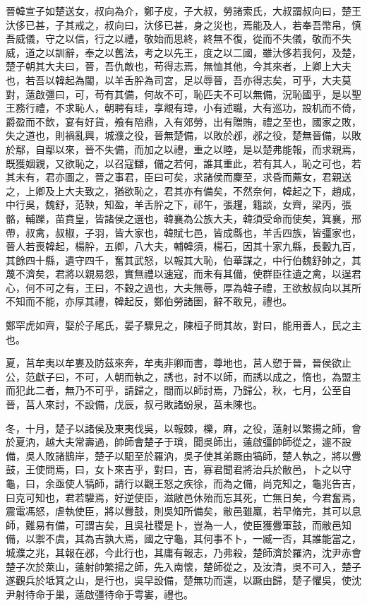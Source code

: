 \begin{pinyinscope}
晉韓宣子如楚送女，叔向為介，鄭子皮，子大叔，勞諸索氏，大叔謂叔向曰，楚王汏侈已甚，子其戒之，叔向曰，汏侈已甚，身之災也，焉能及人，若奉吾幣帛，慎吾威儀，守之以信，行之以禮，敬始而思終，終無不復，從而不失儀，敬而不失威，道之以訓辭，奉之以舊法，考之以先王，度之以二國，雖汏侈若我何，及楚，楚子朝其大夫曰，晉，吾仇敵也，苟得志焉，無恤其他，今其來者，上卿上大夫也，若吾以韓起為閽，以羊舌肸為司宮，足以辱晉，吾亦得志矣，可乎，大夫莫對，薳啟彊曰，可，苟有其備，何故不可，恥匹夫不可以無備，況恥國乎，是以聖王務行禮，不求恥人，朝聘有珪，享覜有璋，小有述職，大有巡功，設机而不倚，爵盈而不飲，宴有好貨，飧有陪鼎，入有郊勞，出有贈賄，禮之至也，國家之敗，失之道也，則禍亂興，城濮之役，晉無楚備，以敗於邲，邲之役，楚無晉備，以敗於鄢，自鄢以來，晉不失備，而加之以禮，重之以睦，是以楚弗能報，而求親焉，既獲姻親，又欲恥之，以召寇讎，備之若何，誰其重此，若有其人，恥之可也，若其未有，君亦圖之，晉之事君，臣曰可矣，求諸侯而麇至，求昏而薦女，君親送之，上卿及上大夫致之，猶欲恥之，君其亦有備矣，不然奈何，韓起之下，趙成，中行吳，魏舒，范鞅，知盈，羊舌肸之下，祁午，張趯，籍談，女齊，梁丙，張骼，輔躒，苗賁皇，皆諸侯之選也，韓襄為公族大夫，韓須受命而使矣，箕襄，邢帶，叔禽，叔椒，子羽，皆大家也，韓賦七邑，皆成縣也，羊舌四族，皆彊家也，晉人若喪韓起，楊肸，五卿，八大夫，輔韓須，楊石，因其十家九縣，長轂九百，其餘四十縣，遺守四千，奮其武怒，以報其大恥，伯華謀之，中行伯魏舒帥之，其蔑不濟矣，君將以親易怨，實無禮以速寇，而未有其備，使群臣往遺之禽，以逞君心，何不可之有，王曰，不穀之過也，大夫無辱，厚為韓子禮，王欲敖叔向以其所不知而不能，亦厚其禮，韓起反，鄭伯勞諸圉，辭不敢見，禮也。

鄭罕虎如齊，娶於子尾氏，晏子驟見之，陳桓子問其故，對曰，能用善人，民之主也。

夏，莒牟夷以牟婁及防茲來奔，牟夷非卿而書，尊地也，莒人愬于晉，晉侯欲止公，范獻子曰，不可，人朝而執之，誘也，討不以師，而誘以成之，惰也，為盟主而犯此二者，無乃不可乎，請歸之，間而以師討焉，乃歸公，秋，七月，公至自晉，莒人來討，不設備，戊辰，叔弓敗諸蚡泉，莒未陳也。

冬，十月，楚子以諸侯及東夷伐吳，以報棘，櫟，麻，之役，薳射以繁揚之師，會於夏汭，越大夫常壽過，帥師會楚子于瑣，聞吳師出，薳啟彊帥師從之，遽不設備，吳人敗諸鵲岸，楚子以馹至於羅汭，吳子使其弟蹶由犒師，楚人執之，將以釁鼓，王使問焉，曰，女卜來吉乎，對曰，吉，寡君聞君將治兵於敝邑，卜之以守龜，曰，余亟使人犒師，請行以觀王怒之疾徐，而為之備，尚克知之，龜兆告吉，曰克可知也，君若驩焉，好逆使臣，滋敝邑休殆而忘其死，亡無日矣，今君奮焉，震電馮怒，虐執使臣，將以釁鼓，則吳知所備矣，敝邑雖羸，若早脩完，其可以息師，難易有備，可謂吉矣，且吳社稷是卜，豈為一人，使臣獲釁軍鼓，而敝邑知備，以禦不虞，其為吉孰大焉，國之守龜，其何事不卜，一臧一否，其誰能當之，城濮之兆，其報在邲，今此行也，其庸有報志，乃弗殺，楚師濟於羅汭，沈尹赤會楚子次於萊山，薳射帥繁揚之師，先入南懷，楚師從之，及汝清，吳不可入，楚子遂觀兵於坻箕之山，是行也，吳早設備，楚無功而還，以蹶由歸，楚子懼吳，使沈尹射待命于巢，薳啟彊待命于雩婁，禮也。


\end{pinyinscope}
